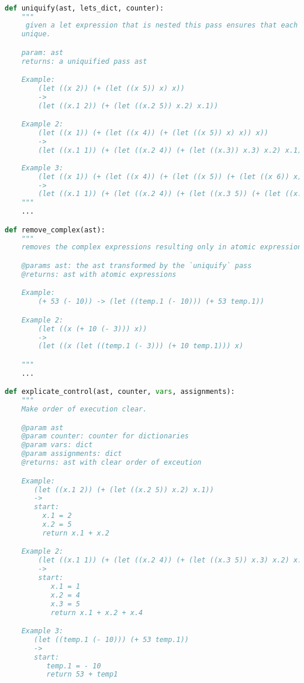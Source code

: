 \documentclass[10pt]{article}
\begin{document}
\begin{lstlisting}[language=python]

def uniquify(ast, lets_dict, counter):
    """ 
     given a let expression that is nested this pass ensures that each var is
    unique.

    param: ast
    returns: a uniquified pass ast

    Example:
        (let ((x 2)) (+ (let ((x 5)) x) x))
        -> 
        (let ((x.1 2)) (+ (let ((x.2 5)) x.2) x.1))

    Example 2:
        (let ((x 1)) (+ (let ((x 4)) (+ (let ((x 5)) x) x)) x))
        ->
        (let ((x.1 1)) (+ (let ((x.2 4)) (+ (let ((x.3)) x.3) x.2) x.1))
    
    Example 3:
        (let ((x 1)) (+ (let ((x 4)) (+ (let ((x 5)) (+ (let ((x 6)) x) x)) x)) x))
        ->
        (let ((x.1 1)) (+ (let ((x.2 4)) (+ (let ((x.3 5)) (+ (let ((x.4 6)) x.4) x.3)) x.2)) x.1))
    """
    ...

def remove_complex(ast):
    """
    removes the complex expressions resulting only in atomic expressions.

    @params ast: the ast transformed by the `uniquify` pass
    @returns: ast with atomic expressions

    Example:
        (+ 53 (- 10)) -> (let ((temp.1 (- 10))) (+ 53 temp.1))

    Example 2:
        (let ((x (+ 10 (- 3))) x))
        ->
        (let ((x (let ((temp.1 (- 3))) (+ 10 temp.1))) x)

    """
    ...

def explicate_control(ast, counter, vars, assignments):
    """
    Make order of execution clear.

    @param ast
    @param counter: counter for dictionaries
    @param vars: dict
    @param assignments: dict
    @returns: ast with clear order of exceution

    Example:
       (let ((x.1 2)) (+ (let ((x.2 5)) x.2) x.1))
       ->
       start:
         x.1 = 2
         x.2 = 5
         return x.1 + x.2

    Example 2:
        (let ((x.1 1)) (+ (let ((x.2 4)) (+ (let ((x.3 5)) x.3) x.2) x.1))
        ->
        start:
           x.1 = 1
           x.2 = 4
           x.3 = 5
           return x.1 + x.2 + x.4

    Example 3:
       (let ((temp.1 (- 10))) (+ 53 temp.1))
       ->
       start:
          temp.1 = - 10
          return 53 + temp1


\end{lstlisting}
\end{document}
